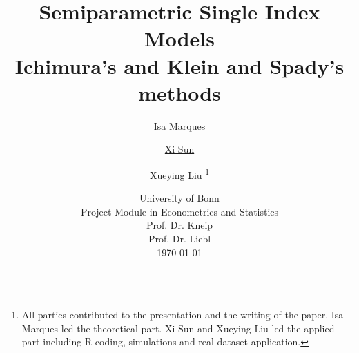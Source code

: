 \usepackage[backend=bibtex, natbib=true,style=numeric]{biblatex}
\setlength{\bibitemsep}{1.5ex}






    \title{
    \vspace{1cm}
    \Huge \textbf{ Semiparametric Single Index Models }\\ \Large Ichimura's and Klein and Spady's methods \\
    }
    
    \vspace{1cm}
    
    
    \author{\Large \href{mailto:first.student@smail.fh-koeln.de}{Isa Marques}\and \Large \href{mailto:second.student@smail.fh-koeln.de}{Xi Sun} \and \Large \href{mailto:second.student@smail.fh-koeln.de}{Xueying Liu}
    \vspace{1cm} \thanks{All parties contributed to the presentation and the writing of the paper. Isa Marques led the theoretical part. Xi Sun and Xueying Liu led the applied part including R coding, simulations and real dataset application.}}
    
    \date{
    \large University of Bonn \\ Project Module in Econometrics and Statistics\\ 
    \vspace{0.8cm}
    \large Prof. Dr. Kneip \\
    \large Prof. Dr. Liebl \\
    \vspace{1cm}
    \today
    }

    \maketitle
    \setlength{\parindent}{0pt}

